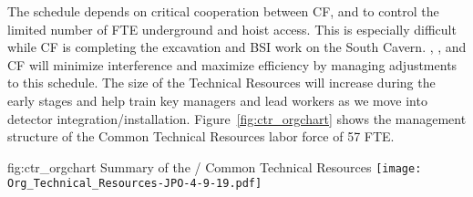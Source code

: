 The schedule depends on critical cooperation between CF, 
and  to control the limited number of FTE underground and
hoist access.  This is especially difficult while CF is completing the
excavation and BSI work on the South Cavern.  ,
,  and CF will minimize interference and
maximize efficiency by managing adjustments to this schedule.  The
size of the Technical Resources will increase during the early stages
and help train key managers and lead workers as we move into detector
integration/installation.  Figure~\ref{fig:ctr_orgchart} shows the
management structure of the Common Technical Resources labor force of
57 FTE.
\begin{dunefigure}{fig:ctr_orgchart}
  {Summary of the / Common Technical Resources}
  \texttt{[image: Org\_Technical\_Resources-JPO-4-9-19.pdf]}
\end{dunefigure}

